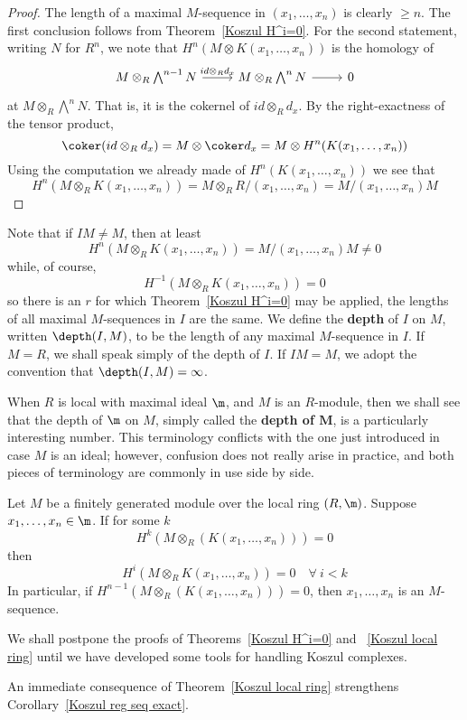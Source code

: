 \begin{proof}
The length of a maximal $M$-sequence in $(x_1,\dots,x_n)$ is clearly $\geq n$. The first conclusion follows from Theorem~\ref{Koszul H^i=0}. For the second statement, writing $N$ for $R^n$, we note that $H^n(M\otimes K(x_1,\dots,x_n))$ is the homology of 
\[\begin{tikzcd}
M\otimes_R\bigwedge^{n-1}N\ar[r,"id\otimes_Rd_x"]&M\otimes_R\bigwedge^{n}N\ar[r]&0
\end{tikzcd}\]
at $M\otimes_R\bigwedge^nN$. That is, it is the cokernel of $id\otimes_Rd_x$. By the right-exactness of the tensor product,
\[\coker(id\otimes_Rd_x)=M\otimes\coker d_x=M\otimes H^n(K(x_1,\dots,x_n))\]
Using the computation we already made of $H^n(K(x_1,\dots,x_n))$ we see that
\[H^n(M\otimes_RK(x_1,\dots,x_n))=M\otimes_RR/(x_1,\dots,x_n)=M/(x_1,\dots,x_n)M\]
\end{proof}
Note that if $IM\neq M$, then at least
\[H^n(M\otimes_RK(x_1,\dots,x_n))=M/(x_1,\dots,x_n)M\neq0\]
while, of course,
\[H^{-1}(M\otimes_RK(x_1,\dots,x_n))=0\]
so there is an $r$ for which Theorem~\ref{Koszul H^i=0} may be applied, the lengths of all maximal $M$-sequences in $I$ are the same. We define the \textbf{depth} of $I$ on $M$, written $\depth(I,M)$, to be the length of any maximal $M$-sequence in $I$. If $M=R$, we shall speak simply of the depth of $I$. If $IM=M$, we adopt the convention that $\depth(I,M)=\infty$.\par
When $R$ is local with maximal ideal $\m$, and $M$ is an $R$-module, then we shall see that the depth of $\m$ on $M$, simply called the \textbf{depth of $\bm{M}$}, is a particularly interesting number. This terminology conflicts with the one just introduced in case $M$ is an ideal; however, confusion does not really arise in practice, and both pieces of terminology are commonly in use side by side.
\begin{theorem}\label{Koszul local ring}
Let $M$ be a finitely generated module over the local ring $(R,\m)$. Suppose $x_1,\dots,x_n\in\m$. If for some $k$
\[H^k(M\otimes_R(K(x_1,\dots,x_n)))=0\]
then 
\[H^i(M\otimes_RK(x_1,\dots,x_n))=0\quad\forall\ i<k\]
In particular, if $H^{n-1}(M\otimes_R(K(x_1,\dots,x_n)))=0$, then $x_1,\dots,x_n$ is an $M$-sequence.
\end{theorem}
We shall postpone the proofs of Theorems~\ref{Koszul H^i=0} and ~\ref{Koszul local ring} until we have developed some tools for handling Koszul complexes.\par
An immediate consequence of Theorem~\ref{Koszul local ring} strengthens Corollary~\ref{Koszul reg seq exact}. 

